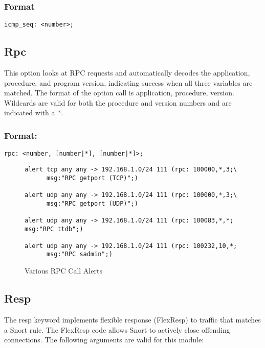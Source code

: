 \documentclass[english]{report}
\begin{document}
\subsubsection{Format}

\begin{verbatim}
icmp_seq: <number>;
\end{verbatim}

\subsection{Rpc}

This option looks at RPC requests and automatically decodes the application,
procedure, and program version, indicating success when all three
variables are matched. The format of the option call is application,
procedure, version. Wildcards are valid for both the procedure
and version numbers and are indicated with a {*}.


\subsubsection{Format:}

\begin{verbatim}
rpc: <number, [number|*], [number|*]>;
\end{verbatim}
%
\begin{figure}[!hbpt]
\begin{verbatim}
alert tcp any any -> 192.168.1.0/24 111 (rpc: 100000,*,3;\
      msg:"RPC getport (TCP)";)

alert udp any any -> 192.168.1.0/24 111 (rpc: 100000,*,3;\
      msg:"RPC getport (UDP)";)

alert udp any any -> 192.168.1.0/24 111 (rpc: 100083,*,*; msg:"RPC ttdb";)

alert udp any any -> 192.168.1.0/24 111 (rpc: 100232,10,*;
      msg:"RPC sadmin";)
\end{verbatim}

\caption{\label{RPC Call examples}Various RPC Call Alerts}
\end{figure}



\subsection{Resp}

The resp keyword implements flexible response (FlexResp) to traffic
that matches a Snort rule. The FlexResp code allows Snort to actively
close offending connections. The following arguments are valid for
this module: 
\end{document}
